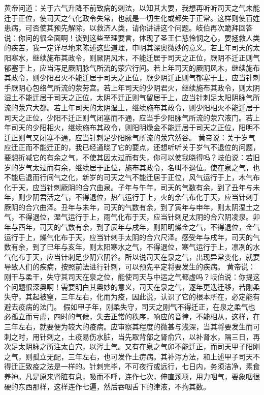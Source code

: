 \documentclass[a4paper,12pt,UTF8,twoside]{ctexbook}
\begin{document}
黄帝问道：关于六气升降不前致病的刺法，以知其大要，我想再听听司天之气未能迁于正位，使司天之气化政令失常，也就是一切生化或都失于正常。这样则使百姓患病，可否使其预先解除，以救济人类，请你讲讲这个问题。岐伯再次跪拜回答说：你问的很全面啊！谈到这些至理要言，体现了圣王仁慈怜悯之心，要拯救人类的疾苦，我一定详尽地来陈述这些道理，申明其深奥微妙的意义。若上年司天的太阳寒水，继续施布其政令，则厥阴风木，不能迁居于司天之正位，厥阴不迁正则气郁塞于上，应当泻足厥阴脉气所流的荥穴行间。若上年司天的厥阴风木，继续施布其政令，则少阳君火不能迁居于司天之正位，厥少阴迁正则气郁塞于上，应当针刺手厥阴心包络气所流的荥劳宫。若上年司天的少阴君火，继续施布其政令，则太阴湿土不能迁居于司天之正位，太阴不迁正则气留居于上，应当针刺足太阳阴脉气所流的荥穴大都。若上年司天的太阴湿土，继续施布其政令，则少阳相火不能迁居于司天之正位，少阳不迁正则气闭塞而不通，应当手少阳脉气所流的荥穴液门。若上年司天的少阳相火，继续施布其政令，则阳明燥金不能迁居于司天之正位，阳明不迁正则气又闭塞不通，应当针刺足少阳脉气所流的荥穴然谷。
黄帝说：关于岁气应迁正而不能迁正的，我已经通晓了它的要点，还想听听关于岁气不退位的问题，要想折减它的有余之气，不使其因太过而有失，你可以使我晓得吗？岐伯说：若旧岁的岁气太过而有余，继续居于正位，施布其政令，名叫不退位。使在泉之气，也不能后退而行间气之化，新岁的司天之气不能迁居于正位，风气运行于上，木气布化于天，应当针刺厥阴的合穴曲泉。子年与午年，司天的气数有余，到了丑年与未年，则少阴君活之气，不得退位，热气运行于上，火的余气布化于天，应当针刺手厥阴的合穴曲泽。丑年与未年，司天的气数有余，到了寅年与申年，则太阴湿土之气，不得退位，湿气运行于上，雨气化布于天，应当针刺足太阴的合穴阴凌泉。卯年与酉年，司天的气数有余，到了辰年与戌年，则阳明燥金之气，不得退位，金气运行于上，燥气化布于天，应当针刺手太阴的合穴尺泽。感受年与戌年，司天的气数有余，到了巳年与亥年，则太阳寒水之气，不得退位，寒气运行于上，凛冽的水气化布于天，应当针刺足少阴穴阴谷。所以说司天在泉之气，出现异常变化，就要导致人们的疾病，按照前法进行针刺，可以预先平定将要发生的疾病。
黄帝说：刚干与柔干，失守其司天在泉之位，能使司天与中运之气都虚吗？岐伯说：你提这个问题很深奥啊！需要明白其奥妙的意义，司天在泉之气，逐年更迭迁移，若刚柔失守，其起被窒，三年左右，化而为疫，因此说，认识了它的根本所在，必定能有避去疫病的法门。
假如甲子年，刚柔失守，司天之刚气不得迁正，在泉之柔气也必孤立而亏虚，四时的气候，失去正常的秩序，响应的音律，不能相从，这样，在三年左右，就要便为较大的疫病。应审察其程度的微甚与浅深，当其将要发生而可刺之时，用针刺之，土疫易伤水脏，当先取背部之肾俞穴，以补肾水，隔三日，再次足太阴脉之所注太白穴，以泻土气。又有在泉之气卯不能迁正，而司天甲子阳刚之气，则孤立无配，三年左右，也可发作土疠病。其补泻方法，和上述甲子司天不得迁正致疫之法是一样的。针刺完毕，不可夜行或远行，七日内，务须洁净，素食养神。凡是原来肾脏有息，吸而不呼，连作七次，伸直颈项，用力咽气，要象咽很硬的东西那样，这样连作七遍，然后吞咽舌下的津液，不拘其数。
\end{document}
